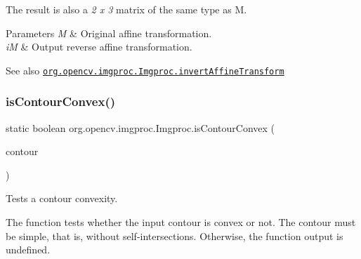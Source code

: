 The result is also a {\itshape 2 x 3} matrix of the same type as {\ttfamily M}.


\begin{DoxyParams}{Parameters}
{\em M} & Original affine transformation. \\
\hline
{\em iM} & Output reverse affine transformation.\\
\hline
\end{DoxyParams}
\begin{DoxySeeAlso}{See also}
\href{http://docs.opencv.org/modules/imgproc/doc/geometric_transformations.html#invertaffinetransform}{\tt org.\+opencv.\+imgproc.\+Imgproc.\+invert\+Affine\+Transform} 
\end{DoxySeeAlso}
\mbox{\label{classorg_1_1opencv_1_1imgproc_1_1_imgproc_a776c38eea614512469ac8192d57b5755}} 
\subsubsection{\texorpdfstring{is\+Contour\+Convex()}{isContourConvex()}}
{\footnotesize\ttfamily static boolean org.\+opencv.\+imgproc.\+Imgproc.\+is\+Contour\+Convex (\begin{DoxyParamCaption}\item[{\mbox{\hyperlink{classorg_1_1opencv_1_1core_1_1_mat_of_point}{Mat\+Of\+Point}}}]{contour }\end{DoxyParamCaption})\hspace{0.3cm}{\ttfamily [static]}}

Tests a contour convexity.

The function tests whether the input contour is convex or not. The contour must be simple, that is, without self-\/intersections. Otherwise, the function output is undefined.


